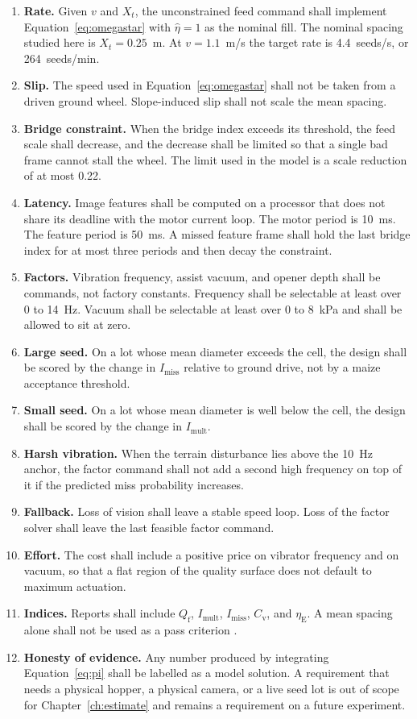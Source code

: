 \begin{enumerate}
\item \textbf{Rate.} Given $v$ and $X_t$, the unconstrained feed command shall implement Equation~\eqref{eq:omegastar} with $\hat\eta=1$ as the nominal fill. The nominal spacing studied here is $X_t=0.25$~m. At $v=1.1$~m/s the target rate is 4.4~seeds/s, or 264~seeds/min.
\item \textbf{Slip.} The speed used in Equation~\eqref{eq:omegastar} shall not be taken from a driven ground wheel. Slope-induced slip shall not scale the mean spacing.
\item \textbf{Bridge constraint.} When the bridge index exceeds its threshold, the feed scale shall decrease, and the decrease shall be limited so that a single bad frame cannot stall the wheel. The limit used in the model is a scale reduction of at most 0.22.
\item \textbf{Latency.} Image features shall be computed on a processor that does not share its deadline with the motor current loop. The motor period is 10~ms. The feature period is 50~ms. A missed feature frame shall hold the last bridge index for at most three periods and then decay the constraint.
\item \textbf{Factors.} Vibration frequency, assist vacuum, and opener depth shall be commands, not factory constants. Frequency shall be selectable at least over 0 to 14~Hz. Vacuum shall be selectable at least over 0 to 8~kPa and shall be allowed to sit at zero.
\item \textbf{Large seed.} On a lot whose mean diameter exceeds the cell, the design shall be scored by the change in $I_{\mathrm{miss}}$ relative to ground drive, not by a maize acceptance threshold.
\item \textbf{Small seed.} On a lot whose mean diameter is well below the cell, the design shall be scored by the change in $I_{\mathrm{mult}}$.
\item \textbf{Harsh vibration.} When the terrain disturbance lies above the 10~Hz anchor, the factor command shall not add a second high frequency on top of it if the predicted miss probability increases.
\item \textbf{Fallback.} Loss of vision shall leave a stable speed loop. Loss of the factor solver shall leave the last feasible factor command.
\item \textbf{Effort.} The cost shall include a positive price on vibrator frequency and on vacuum, so that a flat region of the quality surface does not default to maximum actuation.
\item \textbf{Indices.} Reports shall include $Q_{\mathrm{f}}$, $I_{\mathrm{mult}}$, $I_{\mathrm{miss}}$, $C_{\mathrm{v}}$, and $\eta_{\mathrm{E}}$. A mean spacing alone shall not be used as a pass criterion \cite{kachman1995}.
\item \textbf{Honesty of evidence.} Any number produced by integrating Equation~\eqref{eq:pi} shall be labelled as a model solution. A requirement that needs a physical hopper, a physical camera, or a live seed lot is out of scope for Chapter~\ref{ch:estimate} and remains a requirement on a future experiment.
\end{enumerate}

